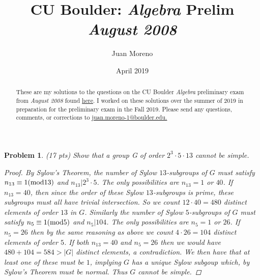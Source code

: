 \documentclass[11pt]{article}
\newcommand{\1}{\textbf{1}}
\newtheorem{prob}{Problem}
\begin{document}
\title{\LARGE \textbf{CU Boulder: \textit{Algebra} %
Prelim \\ \textit{August 2008}} %
\vspace{-.75cm}}%
\author{Juan Moreno
} 
\date{\vspace{-0.45cm}April 2019} %

 
\maketitle

\renewcommand{\abstractname}{\vspace{-\baselineskip}}
\begin{abstract}
\noindent These are my solutions to the questions on the CU Boulder \textit{Algebra} preliminary exam from \textit{August 2008} found  \href{http://math.colorado.edu/documents/graduate/prelim/Algebra_Aug_2008.pdf}{here}. I worked on these solutions over the summer of 2019 in preparation for the preliminary exam in the Fall 2019. Please send any questions, comments, or corrections to \href{mailto: juan.moreno-1@boulder.edu}{juan.moreno-1@boulder.edu.} \\
\end{abstract}

\begin{prob}
(17 pts) Show that a group G of order $2^3 \cdot 5 \cdot 13$ cannot be simple.

\begin{proof}
By Sylow's Theorem, the number of Sylow $13$-subgroups of $G$ must satisfy $n_{13}\equiv 1(\textnormal{mod} 13) $ and $n_{13}\big| 2^3\cdot 5$. The only possibilities are $n_{13} = 1$ or $40$. If $n_{13} = 40$, then since the order of these Sylow $13$-subgroups is prime, these subgroups must all have trivial intersection. So we count $12\cdot 40 = 480$ distinct elements of order $13$ in $G$. Similarly the number of Sylow $5$-subgroups of $G$ must satisfy $n_5 \equiv 1(\textnormal{mod}5)$ and $n_5\big| 104$. The only possibilities are $n_5 = 1$ or $26$. If $n_5 = 26$ then by the same reasoning as above we count $4\cdot 26 = 104$ distinct elements of order $5$. If both $n_{13} = 40$ and $n_5 = 26$ then we would have $480 + 104 = 584 > |G|$ distinct elements, a contradiction. We then have that at least one of these must be $1$, implying $G$ has a unique Sylow subgoup which, by Sylow's Theorem must be normal. Thus $G$ cannot be simple.
\end{proof}
\end{prob}
\end{document}
